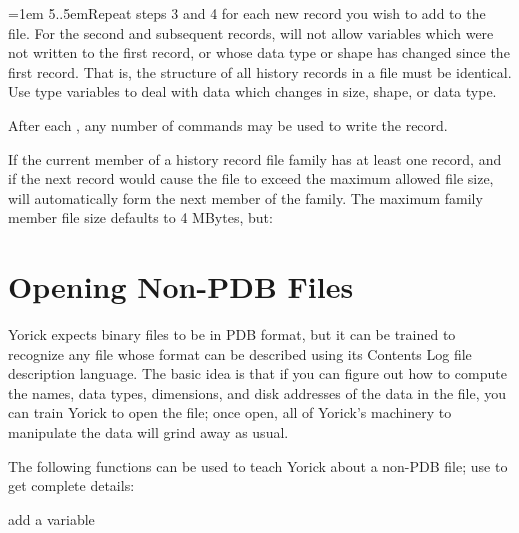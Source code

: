 \hangindent=1em
5.\hglue.5emRepeat steps 3 and 4 for each new record you wish to add to the
file.  For the second and subsequent records,  will not allow
variables which were not written to the first record, or whose data type or
shape has changed since the first record.  That is, the structure of all
history records in a file must be identical.  Use type  variables
to deal with data which changes in size, shape, or data type.

After each , any number of  commands may be used
to write the record.

If the current member of a history record file family has at least one
record, and if the next record would cause the file to exceed the maximum
allowed file size,  will automatically form the next member
of the family.  The maximum family member file size defaults to 4 MBytes, but:


\section{Opening Non-PDB Files}

Yorick expects binary files to be in PDB format, but it can be trained to
recognize any file whose format can be described using its Contents Log
file description language.  The basic idea is that if you can figure out
how to compute the names, data types, dimensions, and disk addresses of the
data in the file, you can train Yorick to open the file; once open, all of
Yorick's machinery to manipulate the data will grind away as usual.

The following functions can be used to teach Yorick about a non-PDB file;
use  to get complete details:

     {add a variable}

